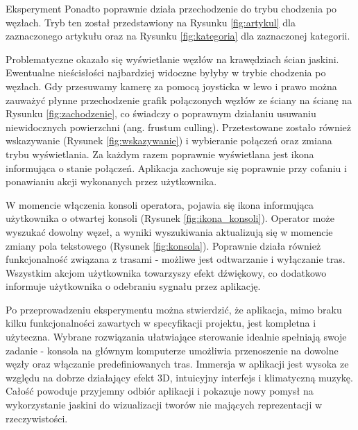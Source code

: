 \begin{chapter}{Eksperyment}
Ponadto poprawnie działa przechodzenie do trybu chodzenia po węzłach. Tryb ten został przedstawiony na Rysunku \ref{fig:artykul} dla zaznaczonego artykułu oraz na Rysunku \ref{fig:kategoria} dla zaznaczonej kategorii. 



Problematyczne okazało się wyświetlanie węzłów na krawędziach ścian jaskini. Ewentualne nieścisłości najbardziej widoczne byłyby w trybie chodzenia po węzłach. Gdy przesuwamy kamerę za pomocą joysticka w lewo i prawo można zauważyć płynne przechodzenie grafik połączonych węzłów ze ściany na ścianę na Rysunku \ref{fig:zachodzenie}, co świadczy o poprawnym działaniu usuwaniu niewidocznych powierzchni (ang. frustum culling). 
Przetestowane zostało również wskazywanie (Rysunek \ref{fig:wskazywanie}) i wybieranie połączeń oraz zmiana trybu wyświetlania. Za każdym razem poprawnie wyświetlana jest ikona informująca o stanie połączeń. Aplikacja zachowuje się poprawnie przy cofaniu i ponawianiu akcji wykonanych przez użytkownika. 



W momencie włączenia konsoli operatora, pojawia się ikona informująca użytkownika o otwartej konsoli (Rysunek \ref{fig:ikona_konsoli}). Operator może wyszukać dowolny węzeł, a wyniki wyszukiwania aktualizują się w momencie zmiany pola tekstowego (Rysunek \ref{fig:konsola}). Poprawnie działa również funkcjonalność związana z trasami - możliwe jest odtwarzanie i wyłączanie tras. Wszystkim akcjom użytkownika towarzyszy efekt dźwiękowy, co dodatkowo informuje użytkownika o odebraniu sygnału przez aplikację.



Po przeprowadzeniu eksperymentu można stwierdzić, że aplikacja, mimo braku kilku funkcjonalności zawartych w specyfikacji projektu, jest kompletna i użyteczna. Wybrane rozwiązania ułatwiające sterowanie idealnie spełniają swoje zadanie - konsola na głównym komputerze umożliwia przenoszenie na dowolne węzły oraz włączanie predefiniowanych tras.  Immersja w aplikacji jest wysoka ze względu na dobrze działający efekt 3D, intuicyjny interfejs i klimatyczną muzykę. Całość powoduje przyjemny odbiór aplikacji i pokazuje nowy pomysł na wykorzystanie jaskini do wizualizacji tworów nie mających reprezentacji w rzeczywistości. 

\end{chapter}
